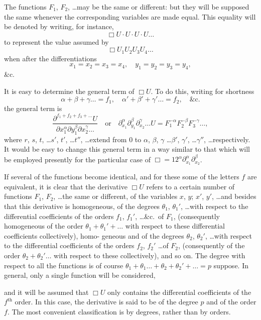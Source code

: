 \documentclass[11pt,a4paper]{article}
\theoremstyle{plain}
\theoremstyle{definition}
\theoremstyle{remark}
\begin{document}
\newpage
The functions $F_1$, $F_2$, \ldots may be the same or different: but they will be supposed the
same whenever the corresponding variables are made equal. This equality will be
denoted by writing, for instance,
\[
\Box U \cdot U \cdot U \cdot U \ldots
\]
to represent the value assumed by
\[
\Box U_1 U_2 U_3 U_4 \ldots
\]
when after the differentiations
\[
x_1 = x_2 = x_3 = x_4, \quad y_1 = y_2 = y_3 = y_4,
\]
\&c.

It is easy to determine the general term of $\Box U$. To do this, writing for shortness
\[
\alpha + \beta + \gamma \ldots = f_1, \quad
\alpha' + \beta' + \gamma' \ldots = f_2, \quad
\&\text{c.}
\]
the general term is
\[
\frac{\partial^{f_1 + f_2 + f_3 + \ldots} U}{\partial x_1^{\alpha} \partial y_1^{\beta} \partial x_2^{\gamma} \ldots}
\quad \text{or} \quad
\partial_{x_1}^{\alpha} \partial_{y_1}^{\beta} \partial_{x_2}^{\gamma} \ldots U
= F_1^{-\alpha} F_2^{-\beta} F_3^{-\gamma} \ldots,
\]
where $r$, $s$, $t$, \ldots $s'$, $t'$, \ldots $t''$, \ldots extend from $0$ to $\alpha$, $\beta$, $\gamma$ \ldots $\beta'$, $\gamma'$, \ldots $\gamma''$, \ldots respectively. It
would be easy to change this general term in a way similar to that which will be
employed presently for the particular case of $\Box = 12^{\alpha} \partial_{x_1}^{\alpha} \partial_{x_2}^{\beta}$.

If several of the functions become identical, and for these some of the letters
$f$ are equivalent, it is clear that the derivative $\Box U$ refers to a certain number of
functions $F_1$, $F_2$, \ldots the same or different, of the variables $x$, $y$; $x'$, $y'$, \ldots and besides
that this derivative is homogeneous, of the degrees $\theta_1$, $\theta_1'$, \ldots with respect to the
differential coefficients of the orders $f_1$, $f_1'$, \ldots \&c.\ of $F_1$, (consequently homogeneous of
the order $\theta_1 + \theta_1' + \ldots$ with respect to these differential coefficients collectively), homo-
geneous and of the degrees $\theta_2$, $\theta_2'$, \ldots with respect to the differential coefficients of
the orders $f_2$, $f_2'$ \ldots of $F_2$, (consequently of the order $\theta_2 + \theta_2' \ldots$ with respect to these
collectively), and so on. The degree with respect to all the functions is of course
$\theta_1 + \theta_1 \ldots + \theta_2 + \theta_2' + \ldots = p$ suppose. In general, only a single function will be considered,

\newpage
and it will be assumed that $\Box U$ only contains the differential coefficients of the
$f^{\text{th}}$ order. In this case, the derivative is said to be of the degree $p$ and of the
order $f$. The most convenient classification is by degrees, rather than by orders.
\end{document}
